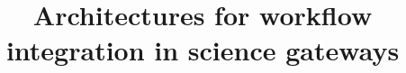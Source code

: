 \documentclass[preprint,3p,twocolumn]{elsarticle}
\begin{document}
\begin{frontmatter}



\title{Architectures for workflow integration in science gateways}


\author{}

\address{}

\begin{abstract}

\end{abstract}

\begin{keyword}



\end{keyword}

\end{frontmatter}



\maketitle
\end{document}
